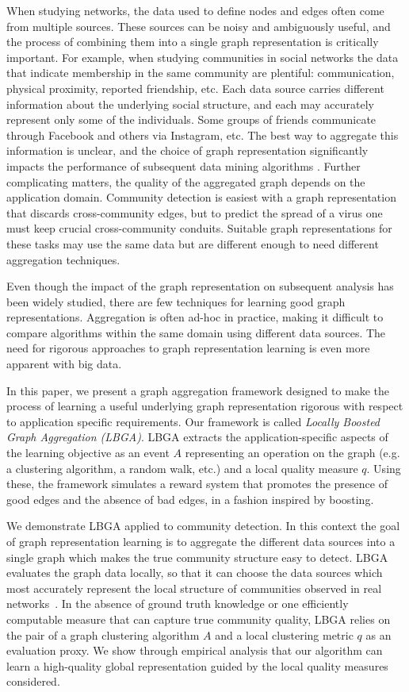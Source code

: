 \documentclass{IEEEtran}
\begin{document}
When studying networks, the data used to define nodes and edges often come from
multiple sources. These sources can be noisy and ambiguously useful, and the
process of combining them into a single graph representation is critically
important. For example, when studying communities in social networks the data
that indicate membership in the same community are plentiful: communication,
physical proximity, reported friendship, etc. Each data source carries 
different information about the underlying social structure, and each
may accurately represent only some of the individuals. Some groups of friends
communicate through Facebook and others via Instagram, etc. The best way to
aggregate this information is unclear, and the choice of graph
representation significantly impacts the performance of subsequent data mining
algorithms \cite{Getoor2005,Gallagher2008,Neville2005,Caceres2011,Miller2014}.
Further complicating matters, the quality of the aggregated graph depends on
the application domain. Community detection is easiest with a graph
representation that discards cross-community edges, but to predict the
spread of a virus one must keep crucial cross-community conduits. Suitable
graph representations for these tasks may use the same data but are different
enough to need different aggregation techniques. 

Even though the impact of the graph representation on subsequent analysis has
been widely studied, there are few techniques for learning good graph
representations. Aggregation is often ad-hoc in practice, making it difficult
to compare algorithms within the same domain using different data sources. The
need for rigorous approaches to graph representation learning is even more
apparent with big data.

In this paper, we present a graph aggregation framework designed to make the
process of learning a useful underlying graph representation rigorous with
respect to application specific requirements. Our framework is called
\emph{Locally Boosted Graph Aggregation (LBGA)}. LBGA extracts the
application-specific aspects of the learning objective as an event $A$
representing an operation on the graph (e.g. a clustering algorithm, a random
walk, etc.) and a local quality measure $q$. Using these, the framework
simulates a reward system that promotes the presence of good edges and the
absence of bad edges, in a fashion inspired by boosting.

We demonstrate LBGA applied to community detection.  In this context the goal
of graph representation learning is to aggregate the different data sources
into a single graph which makes the true community structure easy to detect.
LBGA evaluates the graph data locally, so that it can choose the data sources
which most accurately represent the local structure of communities observed in
real networks~\cite{Aggarwal2011,Leskovec2008}. In the absence of ground truth
knowledge or one efficiently computable measure that can capture true community
quality, LBGA relies on the pair of a graph clustering algorithm $A$ and a
local clustering metric $q$ as an evaluation proxy.  We show through empirical
analysis that our algorithm can learn a high-quality global representation
guided by the local quality measures considered. 
\end{document}
